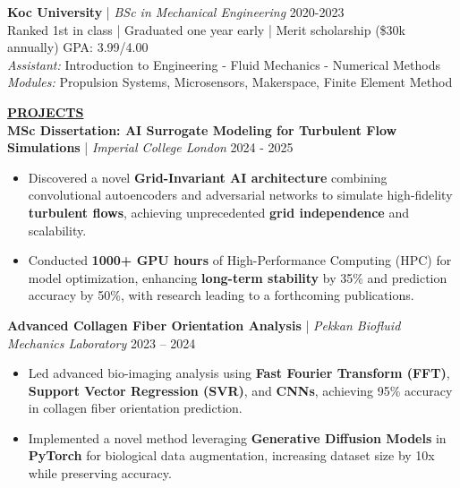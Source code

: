 \documentclass{article}
\newlength{\remaining}
\renewcommand{\section}[1]{
  \vspace{1.0em}\setlength{\remaining}{\textwidth-\widthof{\uppercase{#1}}}
    \noindent\underline{\fontsize{10}{15}\bfseries\uppercase{#1}\hspace*{\remaining}} \\
}
\renewcommand{\subsection}[3]{
    \noindent\textbf{#1} | \emph{#2} \hfill #3  
}
\begin{document}
    \vspace{0.25em}

    \subsection{Koc University}{BSc in Mechanical Engineering}{2020-2023} \\
    Ranked 1st in class | Graduated one year early | Merit scholarship (\$30k annually) \hfill GPA: 3.99/4.00 \\ 
    \textit{Assistant:} Introduction to Engineering - Fluid Mechanics - Numerical Methods \\
    \textit{Modules:} Propulsion Systems, Microsensors, Makerspace, Finite Element Method 


    \section{Projects}
    \subsection{MSc Dissertation: AI Surrogate Modeling for Turbulent Flow Simulations}{Imperial College London}{2024 - 2025} 
    \begin{itemize} 
        \item Discovered a novel \textbf{Grid-Invariant AI architecture} combining convolutional autoencoders and adversarial networks to simulate high-fidelity \textbf{turbulent flows}, achieving unprecedented \textbf{grid independence} and scalability.
        \item Conducted \textbf{1000+ GPU hours} of High-Performance Computing (HPC) for model optimization, enhancing \textbf{long-term stability} by 35\% and prediction accuracy by 50\%, with research leading to a forthcoming publications.
    \end{itemize}

    \subsection{Advanced Collagen Fiber Orientation Analysis}{Pekkan Biofluid Mechanics Laboratory}{2023 – 2024}
    \begin{itemize}
        \item Led advanced bio-imaging analysis using \textbf{Fast Fourier Transform (FFT)}, \textbf{Support Vector Regression (SVR)}, and \textbf{CNNs}, achieving 95\% accuracy in collagen fiber orientation prediction.
        \item Implemented a novel method leveraging \textbf{Generative Diffusion Models} in \textbf{PyTorch} for biological data augmentation, increasing dataset size by 10x while preserving accuracy.

    \end{itemize}
\end{document}
